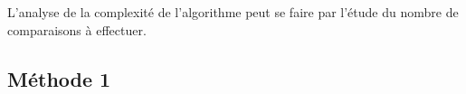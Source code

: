 \documentclass[10pt,fleqn]{article} %
\newcommand{\tsf}[1]{\small{\texttt{#1}}}
\begin{document}
L'analyse de la complexité de l'algorithme peut se faire par l'étude du nombre de comparaisons à effectuer.
\subsection{Méthode 1}

\end{document}
